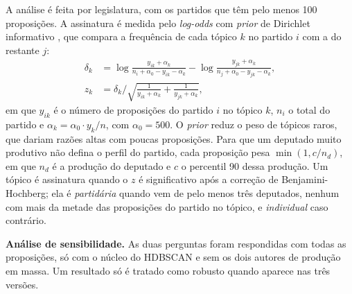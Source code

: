 A análise é feita por legislatura, com os partidos que têm pelo menos 100 proposições. A assinatura é medida pelo \textit{log-odds} com \textit{prior} de Dirichlet informativo \citep{monroe2008fightin}, que compara a frequência de cada tópico $k$ no partido $i$ com a do restante $j$:
\begin{align}
\delta_k &= \log\frac{y_{ik} + \alpha_k}{n_i + \alpha_0 - y_{ik} - \alpha_k} - \log\frac{y_{jk} + \alpha_k}{n_j + \alpha_0 - y_{jk} - \alpha_k}, \\
z_k &= \delta_k \bigg/ \sqrt{\frac{1}{y_{ik} + \alpha_k} + \frac{1}{y_{jk} + \alpha_k}},
\end{align}
em que $y_{ik}$ é o número de proposições do partido $i$ no tópico $k$, $n_i$ o total do partido e $\alpha_k = \alpha_0 \cdot y_k / n$, com $\alpha_0 = 500$. O \textit{prior} reduz o peso de tópicos raros, que dariam razões altas com poucas proposições. Para que um deputado muito produtivo não defina o perfil do partido, cada proposição pesa $\min(1, c/n_d)$, em que $n_d$ é a produção do deputado e $c$ o percentil 90 dessa produção. Um tópico é assinatura quando o $z$ é significativo após a correção de Benjamini-Hochberg; ela é \textit{partidária} quando vem de pelo menos três deputados, nenhum com mais da metade das proposições do partido no tópico, e \textit{individual} caso contrário.

\textbf{Análise de sensibilidade.} As duas perguntas foram respondidas com todas as proposições, só com o núcleo do HDBSCAN e sem os dois autores de produção em massa. Um resultado só é tratado como robusto quando aparece nas três versões.
